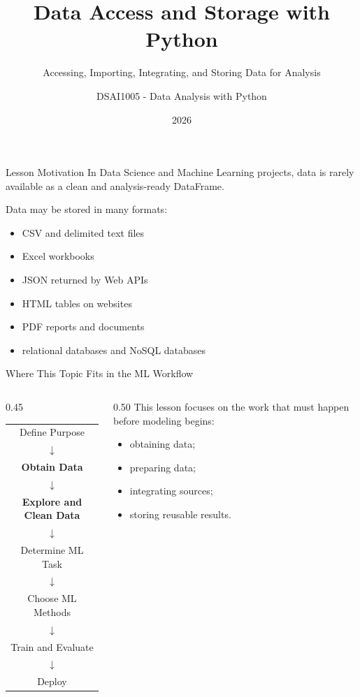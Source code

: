 \documentclass[aspectratio=169,11pt]{beamer}
\title[Data Access and Storage]{Data Access and Storage with Python}
\subtitle{Accessing, Importing, Integrating, and Storing Data for Analysis}
\author{DSAI1005 - Data Analysis with Python}
\institute{Faculty of Data Science and Artificial Intelligence\\National Economics University}
\date{2026}
\newcommand{\smallgap}{\vspace{0.4em}}
\begin{document}
\begin{frame}
  \titlepage
\end{frame}

\begin{frame}{Lesson Motivation}
In Data Science and Machine Learning projects, data is rarely available as a clean and analysis-ready DataFrame.

\smallgap
Data may be stored in many formats:
\begin{itemize}
  \item CSV and delimited text files
  \item Excel workbooks
  \item JSON returned by Web APIs
  \item HTML tables on websites
  \item PDF reports and documents
  \item relational databases and NoSQL databases
\end{itemize}
\end{frame}

\begin{frame}{Where This Topic Fits in the ML Workflow}
\begin{columns}[T]
\begin{column}{0.45\textwidth}
\begin{center}
\small
\begin{tabular}{c}
Define Purpose \\
$\downarrow$ \\
\textbf{Obtain Data} \\
$\downarrow$ \\
\textbf{Explore and Clean Data} \\
$\downarrow$ \\
Determine ML Task \\
$\downarrow$ \\
Choose ML Methods \\
$\downarrow$ \\
Train and Evaluate \\
$\downarrow$ \\
Deploy
\end{tabular}
\end{center}
\end{column}
\begin{column}{0.50\textwidth}
This lesson focuses on the work that must happen before modeling begins:
\begin{itemize}
  \item obtaining data;
  \item preparing data;
  \item integrating sources;
  \item storing reusable results.
\end{itemize}
\end{column}
\end{columns}
\end{frame}
\end{document}
